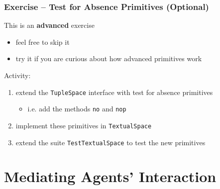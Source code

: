 \documentclass[presentation]{beamer}\mode<presentation>{\usetheme{AMSCesenaPurpleAndGold}}
\begin{document}
\begin{frame}[allowframebreaks]
	\frametitle{Exercise \currentExercise{} -- Test for Absence Primitives (Optional)}

	\begin{alertblock}{This is an \textbf{advanced} exercise}
		\begin{itemize}
			\item feel free to skip it
			\item try it if you are curious about how advanced primitives work
		\end{itemize}
	\end{alertblock}

	\bigskip

	Activity:
	\medskip
	\begin{enumerate}
		\item extend the \texttt{TupleSpace} interface with \alert{test for absence} primitives
		\begin{itemize}
			\item i.e. add the methods \texttt{no} and \texttt{nop}
		\end{itemize}

		\medskip

		\item implement these primitives in \texttt{TextualSpace}

		\medskip

		\item extend the suite \texttt{TestTextualSpace} to test the new primitives

	\end{enumerate}

\end{frame}

\section{Mediating Agents' Interaction}
\end{document}
